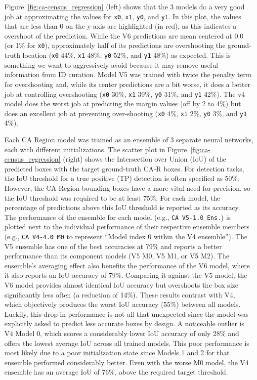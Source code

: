Figure~\ref{fig:ca-census_regression} (left) shows that the 3 models do a very good job at approximating the values for \texttt{x0}, \texttt{x1}, \texttt{y0}, and \texttt{y1}.  In this plot, the values that are less than 0 on the y-axis are highlighted (in red), as this indicates a overshoot of the prediction.  While the V6 predictions are mean centered at 0.0 (or 1\% for \texttt{x0}), approximately half of its predictions are overshooting the ground-truth location (\texttt{x0} 44\%, \texttt{x1} 48\%, \texttt{y0} 52\%, and \texttt{y1} 48\%) as expected.  This is something we want to aggressively avoid because it may remove useful information from ID curation.  Model V5 was trained with twice the penalty term for overshooting and, while its center predictions are a bit worse, it does a better job at controlling overshooting (\texttt{x0} 30\%, \texttt{x1} 39\%, \texttt{y0} 31\%, and \texttt{y1} 42\%).  The v4 model does the worst job at predicting the margin values (off by 2 to 4\%) but does an excellent job at preventing over-shooting (\texttt{x0} 4\%, \texttt{x1} 2\%, \texttt{y0} 3\%, and \texttt{y1} 4\%).

Each CA Region model was trained as an ensemble of 3 separate neural networks, each with different initializations.  The scatter plot in Figure~\ref{fig:ca-census_regression} (right) shows the Intersection over Union (IoU) of the predicted boxes with the target ground-truth CA-R boxes.  For detection tasks, the IoU threshold for a true positive (TP) detection is often specified as 50\%.  However, the CA Region bounding boxes have a more vital need for precision, so the IoU threshold was required to be at least 75\%.  For each model, the percentage of predictions above this IoU threshold is reported as its accuracy.  The performance of the ensemble for each model (e.g., \texttt{CA V5-1.0 Ens.}) is plotted next to the individual performance of their respective ensemble members (e.g., \texttt{CA V4-4.0 M0} to represent ``Model index 0 within the V4 ensemble'').  The V5 ensemble has one of the best accuracies at 79\% and reports a better performance than its component models (V5 M0, V5 M1, or V5 M2).  The ensemble's averaging effect also benefits the performance of the V6 model, where it also reports an IoU accuracy of 79\%.  Comparing it against the V5 model, the V6 model provides almost identical IoU accuracy but overshoots the box size significantly less often (a reduction of 14\%).  These results contrast with V4, which objectively produces the worst IoU accuracy (55\%) between all models.  Luckily, this drop in performance is not all that unexpected since the model was explicitly asked to predict less accurate boxes by design.  A noticeable outlier is V4 Model 0, which scores a considerably lower IoU accuracy of only 28\% and offers the lowest average IoU across all trained models.  This poor performance is most likely due to a poor initialization state since Models 1 and 2 for that ensemble performed considerably better.  Even with the worse M0 model, the V4 ensemble has an average IoU of 76\%, above the required target threshold.

